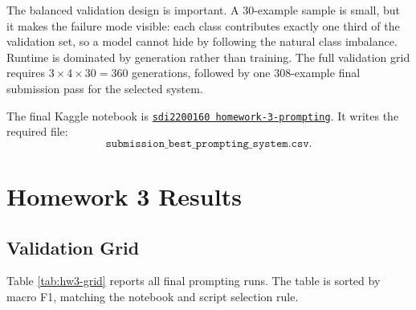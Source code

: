 \documentclass[12pt]{fphw}
\newcommand{\CR}{Clear Reply}
\newcommand{\AMB}{Ambivalent}
\newcommand{\CNR}{Clear Non-Reply}
\begin{document}
The balanced validation design is important. A 30-example sample is small, but it makes the failure mode visible: each class contributes exactly one third of the validation set, so a model cannot hide by following the natural class imbalance. Runtime is dominated by generation rather than training. The full validation grid requires $3 \times 4 \times 30 = 360$ generations, followed by one 308-example final submission pass for the selected system.

The final Kaggle notebook is \href{https://www.kaggle.com/code/nikosskiadas/sdi2200160-homework-3-prompting}{\texttt{sdi2200160 homework-3-prompting}}. It writes the required file:
\[
\texttt{submission\_best\_prompting\_system.csv}.
\]

\section{Homework 3 Results}

\subsection{Validation Grid}

Table \ref{tab:hw3-grid} reports all final prompting runs. The table is sorted by macro F1, matching the notebook and script selection rule.

\begin{table}[h]
\centering
\scriptsize
{}
\caption{Final HW3 validation runs on a balanced 30-example sample. CR = \CR; Amb. = \AMB; CNR = \CNR. Selection is by macro F1, with accuracy as tie-breaker.}
\label{tab:hw3-grid}
\end{table}
\end{document}
